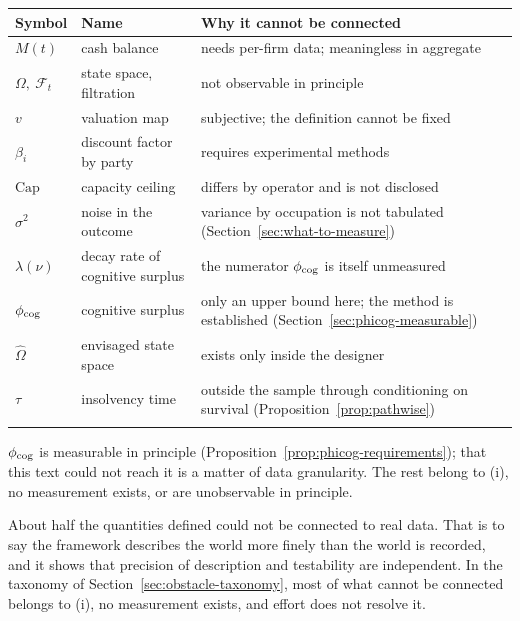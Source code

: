 \begin{center}
\begin{tabularx}{\textwidth}{@{}llX@{}}
\toprule
Symbol & Name & Why it cannot be connected \\
\midrule
$M(t)$ & cash balance & needs per-firm data; meaningless in aggregate \\
$\Omega,\ \mathcal{F}_t$ & state space, filtration & not observable in principle \\
$v$ & valuation map & subjective; the definition cannot be fixed \\
$\beta_i$ & discount factor by party & requires experimental methods \\
$\mathrm{Cap}$ & capacity ceiling & differs by operator and is not disclosed \\
$\sigma^2$ & noise in the outcome & variance by occupation is not tabulated (Section~\ref{sec:what-to-measure}) \\
$\lambda(\nu)$ & decay rate of cognitive surplus & the numerator $\phi_{\rm cog}$ is itself unmeasured \\
$\phi_{\rm cog}$ & cognitive surplus & only an upper bound here; the method is established (Section~\ref{sec:phicog-measurable}) \\
$\hat\Omega$ & envisaged state space & exists only inside the designer \\
$\tau$ & insolvency time & outside the sample through conditioning on survival (Proposition~\ref{prop:pathwise}) \\
& & \\
\bottomrule
\end{tabularx}
\label{tab:unmeasured-quantities}
\end{center}

$\phi_{\rm cog}$ is measurable in principle (Proposition~\ref{prop:phicog-requirements}); that
this text could not reach it is a matter of data granularity. The rest belong to (i), no
measurement exists, or are unobservable in principle.

\begin{remark}
About half the quantities defined could not be connected to real data. That is to say the
framework describes the world more finely than the world is recorded, and it shows that
precision of description and testability are independent. In the taxonomy of
Section~\ref{sec:obstacle-taxonomy}, most of what cannot be connected belongs to (i), no
measurement exists, and effort does not resolve it.
\end{remark}
